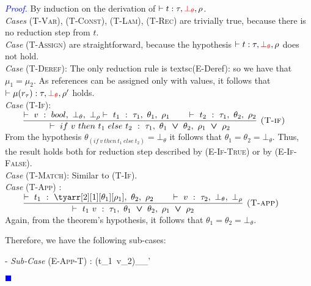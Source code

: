 \documentclass[a4paper,11pt,oneside]{article}
\theoremstyle{plain}
\renewenvironment{proof}{\noindent \textcolor{blue}{\textit{Proof.}}}
{{\begin{tiny}\textcolor{blue}{$\blacksquare$}\end{tiny}}\\}
\newcommand{\bvee}{\boldsymbol{~\vee~}}
\newcommand{\typing}[4]{\vdash~#1~:~#2,~#3,~#4}
\newcommand{\bth}{\bot_\theta}
\newcommand{\brh}{\bot_\rho}
\newcommand{\mem}{_{\mu}}\newcommand{\memp}{_{\mu'}}
\newcommand{\ghead}[2]{~#1~\stackrel{\epsilon}{\rightarrow}~#2~}
\begin{document}
\begin{proof}
\label{proof:preserv-prop-p}
  By induction on the derivation of $\vdash t : \tau, \textcolor{red}{\bth}, \rho$.\\
  
  \noindent\textit{Cases} \textsc{(T-Var), (T-Const), (T-Lam), (T-Rec)}  are trivially true, because there is no reduction step from $t$. \\
  
  \noindent\textit{Case} \textsc{(T-Assign)} are straightforward, because the hypothesis 
  $\vdash t : \tau, \textcolor{red}{\bth}, \rho $ does not hold.\\
  
   \noindent\textit{Case} \textsc{(T-Deref)}: The only reduction rule is textsc{(E-Deref)}:  \infax[E-Deref]{\ghead{{!r_\tau}_{\mem}} {\mu_{}(r_\tau)}}
    so we have that $\mu_1 = \mu_2$.  As references can be assigned only with values, it follows that $\vdash \mu(r_\tau) : \tau, \textcolor{red}{\bth}, \rho' $ holds. \\ 

  \noindent\textit{Case} \textsc{(T-If)}: $\qquad \dfrac
	{
		\typing{v}{bool}{\bth}{\brh}
		\typing{t_1}{\tau_1}{\theta_1}{\rho_1} \qquad
		\typing{t_2}{\tau_1}{\theta_2}{\rho_2}
	}
	{	\typing{if~v~then~t_1~else~t_2}
		{\tau_1}{\theta_1 \bvee \theta_2}{\rho_1 \bvee \rho_2}}
	{\textsc{  (T-if)}}$ \\
  
	From the hypothesis $\theta_{(if~v~then~t_1~else~t_2)} = \bth$ it follows that $\theta_1 = \theta_2 = \bth$. Thus, the result holds both for reduction step described by \textsc{(E-If-True)} or by \textsc{(E-If-False)}. \\
   
  \noindent\textit{Case} \textsc{(T-Match)}: \qquad Similar to \textsc{(T-If)}. \\
   
   \noindent\textit{Case} \textsc{(T-App)} : $\qquad \dfrac
	{
		\typing{t_1}{\tyarr[2][1][\theta_1][\rho_1]}{\theta_2}{\rho_2} \qquad
		\typing{v}{\tau_2}{\bth}{\brh}}
	{
		\typing{t_1~v}{\tau_1}{\theta_1 \bvee \theta_2}{\rho_1 \bvee \rho_2}}
	{
		\textsc{  (T-app)}} $ \\
		
Again, from the theorem's hypothesis, it follows that $\theta_1 = \theta_2 = \bth$.


Therefore, we have the following sub-cases: 

- \textit{Sub-Case} \textsc{(E-App-T)} :
 \infrule[E-App-T]	
	{{t_{1}}\mem \rightarrow {{t'}_{1}}\memp}
	{{(t_{1}~v_2)}\mem {}\memp}
	

\end{proof}
\end{document}
